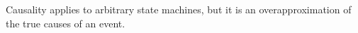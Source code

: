 Causality applies to arbitrary state machines, but it is an overapproximation
of the true causes of an event.

\vspace{0.5in}


